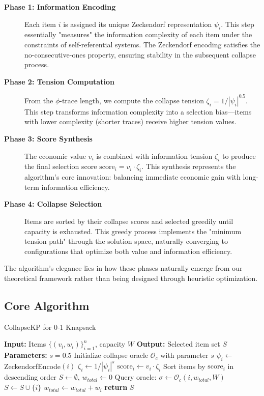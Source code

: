 \documentclass[11pt]{article}
\theoremstyle{remark}
\theoremstyle{definition}
\begin{document}
\begin{description}
\item[\textbf{Phase 1: Information Encoding}] Each item $i$ is assigned its unique Zeckendorf representation $\psi_i$. This step essentially "measures" the information complexity of each item under the constraints of self-referential systems. The Zeckendorf encoding satisfies the no-consecutive-ones property, ensuring stability in the subsequent collapse process.

\item[\textbf{Phase 2: Tension Computation}] From the $\phi$-trace length, we compute the collapse tension $\zeta_i = 1/|\psi_i|^{0.5}$. This step transforms information complexity into a selection bias—items with lower complexity (shorter traces) receive higher tension values.

\item[\textbf{Phase 3: Score Synthesis}] The economic value $v_i$ is combined with information tension $\zeta_i$ to produce the final selection score $\text{score}_i = v_i \cdot \zeta_i$. This synthesis represents the algorithm's core innovation: balancing immediate economic gain with long-term information efficiency.

\item[\textbf{Phase 4: Collapse Selection}] Items are sorted by their collapse scores and selected greedily until capacity is exhausted. This greedy process implements the "minimum tension path" through the solution space, naturally converging to configurations that optimize both value and information efficiency.
\end{description}

The algorithm's elegance lies in how these phases naturally emerge from our theoretical framework rather than being designed through heuristic optimization.

\subsection{Core Algorithm}

\begin{algorithm}[H]
\caption{CollapseKP for 0-1 Knapsack}
\label{alg:collapse_core}
\begin{algorithmic}[1]
\STATE \textbf{Input:} Items $\{(v_i, w_i)\}_{i=1}^n$, capacity $W$
\STATE \textbf{Output:} Selected item set $S$
\STATE \textbf{Parameters:} $s = 0.5$
\STATE
\STATE Initialize collapse oracle $\mathcal{O}_c$ with parameter $s$
    \STATE $\psi_i \leftarrow$ ZeckendorfEncode$(i)$
    \STATE $\zeta_i \leftarrow 1/|\psi_i|^s$
    \STATE $\text{score}_i \leftarrow v_i \cdot \zeta_i$
\ENDFOR
\STATE
\STATE Sort items by $\text{score}_i$ in descending order
\STATE
\STATE $S \leftarrow \emptyset$, $w_{total} \leftarrow 0$
    \STATE Query oracle: $\sigma \leftarrow \mathcal{O}_c(i, w_{total}, W)$
        \STATE $S \leftarrow S \cup \{i\}$
        \STATE $w_{total} \leftarrow w_{total} + w_i$
    \ENDIF
\ENDFOR
\STATE \textbf{return} $S$
\end{algorithmic}
\end{algorithm}
\end{document}
